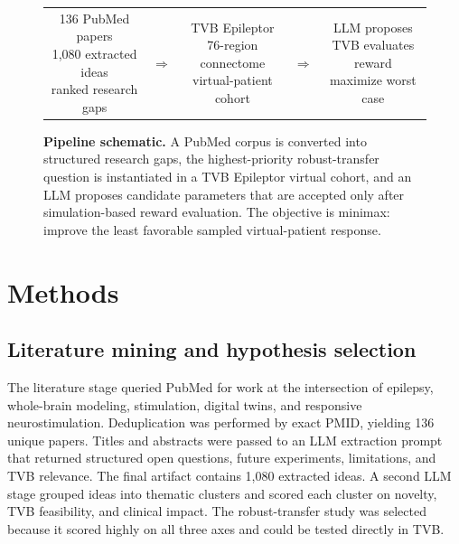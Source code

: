 \documentclass{article}
\begin{document}
\begin{figure}[t]
  \centering
  \setlength{\tabcolsep}{4pt}
  \newcommand{\pipelinebox}[2]{%
    \fbox{\parbox[c][2.0cm][c]{0.23\textwidth}{%
      \centering \textbf{#1}\\[0.35em]\footnotesize #2%
    }}%
  }
  \begin{tabular}{ccccc}
    \pipelinebox{1. Literature}{136 PubMed papers\\1,080 extracted ideas\\ranked research gaps}
    &
    $\Longrightarrow$
    &
    \pipelinebox{2. Simulation}{TVB Epileptor\\76-region connectome\\virtual-patient cohort}
    &
    $\Longrightarrow$
    &
    \pipelinebox{3. Minimax search}{LLM proposes\\TVB evaluates reward\\maximize worst case}
  \end{tabular}
  \caption{\textbf{Pipeline schematic.} A PubMed corpus is converted into structured research gaps, the highest-priority robust-transfer question is instantiated in a TVB Epileptor virtual cohort, and an LLM proposes candidate parameters that are accepted only after simulation-based reward evaluation. The objective is minimax: improve the least favorable sampled virtual-patient response.}
  \label{fig:method}
\end{figure}

\section{Methods}
\subsection{Literature mining and hypothesis selection}
The literature stage queried PubMed for work at the intersection of epilepsy, whole-brain modeling, stimulation, digital twins, and responsive neurostimulation. Deduplication was performed by exact PMID, yielding 136 unique papers. Titles and abstracts were passed to an LLM extraction prompt that returned structured open questions, future experiments, limitations, and TVB relevance. The final artifact contains 1,080 extracted ideas. A second LLM stage grouped ideas into thematic clusters and scored each cluster on novelty, TVB feasibility, and clinical impact. The robust-transfer study was selected because it scored highly on all three axes and could be tested directly in TVB.
\end{document}
